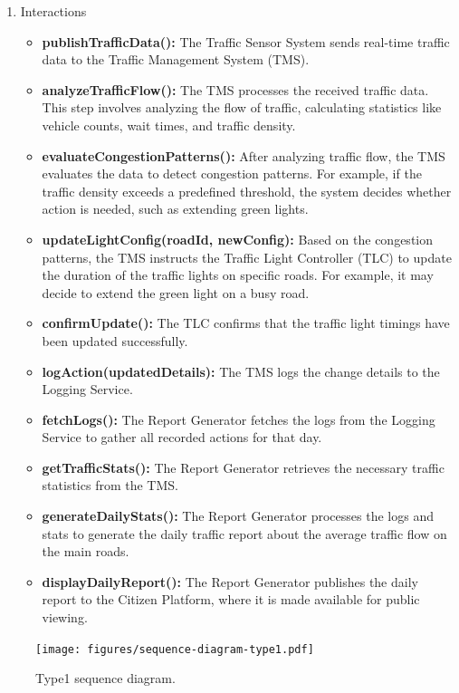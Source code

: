 \documentclass[11.5pt]{article}
\begin{document}
\begin{enumerate}
    \item Interactions
        \begin{itemize}
        \item \textbf{publishTrafficData():} The Traffic Sensor System sends real-time traffic data to the Traffic Management System (TMS).
        \item \textbf{analyzeTrafficFlow():} The TMS processes the received traffic data. This step involves analyzing the flow of traffic, calculating statistics like vehicle counts, wait times, and traffic density.
        \item \textbf{evaluateCongestionPatterns():} After analyzing traffic flow, the TMS evaluates the data to detect congestion patterns. For example, if the traffic density exceeds a predefined threshold, the system decides whether action is needed, such as extending green lights.
        \item \textbf{updateLightConfig(roadId, newConfig):} Based on the congestion patterns, the TMS instructs the Traffic Light Controller (TLC) to update the duration of the traffic lights on specific roads. For example, it may decide to extend the green light on a busy road.
        \item \textbf{confirmUpdate():} The TLC confirms that the traffic light timings have been updated successfully.
        \item \textbf{logAction(updatedDetails):} The TMS logs the change details to the Logging Service.
        \item \textbf{fetchLogs():} The Report Generator fetches the logs from the Logging Service to gather all recorded actions for that day.
        \item \textbf{getTrafficStats():} The Report Generator retrieves the necessary traffic statistics from the TMS. 
        \item \textbf{generateDailyStats():} The Report Generator processes the logs and stats to generate the daily traffic report about the average traffic flow on the main roads.
        \item \textbf{displayDailyReport():} The Report Generator publishes the daily report to the Citizen Platform, where it is made available for public viewing.
    \end{itemize}
    \end{enumerate}

    \begin{figure}[htbp]
        \centering
        \texttt{[image: figures/sequence-diagram-type1.pdf]}
        \caption{Type1 sequence diagram.}
        \label{fig:sequence-diagram-type1}
    \end{figure}
    
\end{document}
